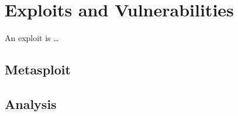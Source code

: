 \section{Exploits and Vulnerabilities}
An exploit is \dots

\subsection{Metasploit}


\subsection{Analysis}

